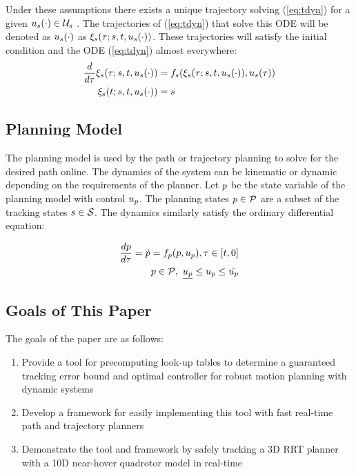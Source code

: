 Under these assumptions there exists a unique trajectory solving (\ref{eq:tdyn}) for a given $u_s(\cdot) \in \mathcal{U}_s$ \cite{Coddington84}. The trajectories of (\ref{eq:tdyn}) that solve this ODE will be denoted as $u_s(\cdot)$ as $\xi_{s}(\tau; s, t, u_s(\cdot))$. These trajectories will satisfy the initial condition and the ODE (\ref{eq:tdyn}) almost everywhere:
\begin{equation}
\label{eq:fdyn_traj}
\begin{aligned}
\frac{d}{d\tau}\xi_{s}(\tau; s, t, u_s(\cdot)) &= f_s(\xi_{s}(\tau; s, t, u_s(\cdot)), u_s(\tau)) \\
\xi_{s}(t; s, t, u_s(\cdot)) &= s
\end{aligned}
\end{equation}

\subsection{Planning Model}
The planning model is used by the path or trajectory planning to solve for the desired path online.  The dynamics of the system can be kinematic or dynamic depending on the requirements of the planner. Let $p$ be the state variable of the planning model with control $u_p$. The planning states $p \in \mathcal{P}$ are a subset of the tracking states $s \in \mathcal{S}$. The dynamics similarly satisfy the ordinary differential equation:

\begin{equation}
\begin{aligned}
\label{eq:pdyn}
\frac{dp}{d\tau} = \dot{p} = f_p(p, u_p), \tau \in [t, 0] \\
p \in \mathcal{P}, \ \underline{u_p} \leq u_p \leq \bar{u_p}
\end{aligned}
\end{equation}

\subsection{Goals of This Paper}
The goals of the paper are as follows:
\begin{enumerate}
	\item Provide a tool for precomputing look-up tables to determine a guaranteed tracking error bound and optimal controller for robust motion planning with dynamic systems
	\item Develop a framework for easily implementing this tool with fast real-time path and trajectory planners
	\item Demonstrate the tool and framework by safely tracking a 3D RRT planner with a 10D near-hover quadrotor model in real-time
\end{enumerate}
